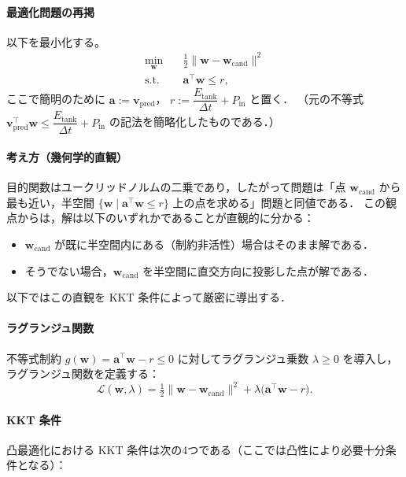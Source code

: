 \documentclass[uplatex]{jsarticle}
\begin{document}
\paragraph{最適化問題の再掲}
以下を最小化する。
\begin{align}
 \min_{\boldsymbol{w}} \quad & \tfrac{1}{2}\|\boldsymbol{w}-\boldsymbol{w}_{\mathrm{cand}}\|^2 \label{eq:qp_obj_re}\\
 \text{s.t.}\quad & \boldsymbol{a}^\top \boldsymbol{w} \le r, \label{eq:lin_const}
\end{align}
ここで簡明のために \(\boldsymbol{a} := \boldsymbol{v}_{\mathrm{pred}}\)，
\(r := \dfrac{E_{\mathrm{tank}}}{\Delta t} + P_{\mathrm{in}}\) と置く．
（元の不等式 \( \boldsymbol{v}_{\mathrm{pred}}^\top \boldsymbol{w} \le \dfrac{E_{\mathrm{tank}}}{\Delta t} + P_{\mathrm{in}} \) の記法を簡略化したものである．）

\paragraph{考え方（幾何学的直観）}
目的関数はユークリッドノルムの二乗であり，したがって問題は「点 \(\boldsymbol{w}_{\mathrm{cand}}\) から最も近い，半空間 \(\{\boldsymbol{w}\mid \boldsymbol{a}^\top\boldsymbol{w}\le r\}\) 上の点を求める」問題と同値である．
この観点からは，解は以下のいずれかであることが直観的に分かる：
\begin{itemize}
 \item \(\boldsymbol{w}_{\mathrm{cand}}\) が既に半空間内にある（制約非活性）場合はそのまま解である．
 \item そうでない場合，\(\boldsymbol{w}_{\mathrm{cand}}\) を半空間に直交方向に投影した点が解である．
\end{itemize}
以下ではこの直観を KKT 条件によって厳密に導出する．

\paragraph{ラグランジュ関数}
不等式制約 \(g(\boldsymbol{w}) = \boldsymbol{a}^\top \boldsymbol{w} - r \le 0\) に対してラグランジュ乗数 \(\lambda \ge 0\) を導入し，ラグランジュ関数を定義する：
\begin{equation}
 \mathcal{L}(\boldsymbol{w},\lambda) = \tfrac{1}{2}\|\boldsymbol{w}-\boldsymbol{w}_{\mathrm{cand}}\|^2 + \lambda\big(\boldsymbol{a}^\top\boldsymbol{w} - r\big).
\end{equation}

\paragraph{KKT 条件}
凸最適化における KKT 条件は次の4つである（ここでは凸性により必要十分条件となる）：
\end{document}
